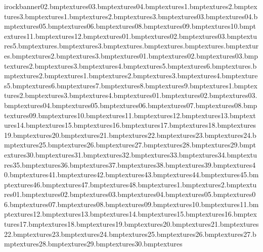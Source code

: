 irockbanner02.bmp textures\safarirockbanner03.bmp textures\safarirockbanner04.bmp textures\safaristepsand1.bmp textures\safaristepsand2.bmp textures\safaristepsand3.bmp textures\safaristepstriangles1.bmp textures\safaristepstriangles2.bmp textures\safaristepstriangles3.bmp textures\safaritemple03.bmp textures\safaritemple04.bmp textures\safaritemple05.bmp textures\safaritemple06.bmp textures\safaritemple08.bmp textures\safaritemple09.bmp textures\safaritemple10.bmp textures\safaritemple11.bmp textures\safaritemple12.bmp textures\safaritemplefloor01.bmp textures\safaritemplefloor02.bmp textures\safaritemplefloor03.bmp textures\safe5.bmp textures\safeback.bmp textures\safeside3.bmp textures\safsamface.bmp textures\safwheel.bmp textures\safwheelgrip.bmp textures\sand.bmp textures\sand2.bmp textures\sand3.bmp textures\sandbeach01.bmp textures\sandbeach02.bmp textures\sandbeach03.bmp textures\sandbed2.bmp textures\sandbed3.bmp textures\sandbed4.bmp textures\sandbed5.bmp textures\sandbed6.bmp textures\sandbedrock.bmp textures\sandbedrock2.bmp textures\sandcastle1.bmp textures\sandcastle2.bmp textures\sandcastle3.bmp textures\sandcastle4.bmp textures\sandcastle5.bmp textures\sandcastle6.bmp textures\sandcastle7.bmp textures\sandcastle8.bmp textures\sandcastle9.bmp textures\sandedge1.bmp textures\sandedge2.bmp textures\sandedge3.bmp textures\sandedge4.bmp textures\sandrock01.bmp textures\sandrock02.bmp textures\sandrock03.bmp textures\sandrock04.bmp textures\sandrock05.bmp textures\sandrock06.bmp textures\sandrock07.bmp textures\sandrock08.bmp textures\sandrock09.bmp textures\sandrock10.bmp textures\sandrock11.bmp textures\sandrock12.bmp textures\sandrock13.bmp textures\sandrock14.bmp textures\sandrock15.bmp textures\sandrock16.bmp textures\sandrock17.bmp textures\sandrock18.bmp textures\sandrock19.bmp textures\sandrock20.bmp textures\sandrock21.bmp textures\sandrock22.bmp textures\sandrock23.bmp textures\sandrock24.bmp textures\sandrock25.bmp textures\sandrock26.bmp textures\sandrock27.bmp textures\sandrock28.bmp textures\sandrock29.bmp textures\sandrock30.bmp textures\sandrock31.bmp textures\sandrock32.bmp textures\sandrock33.bmp textures\sandrock34.bmp textures\sandrock35.bmp textures\sandrock36.bmp textures\sandrock37.bmp textures\sandrock38.bmp textures\sandrock39.bmp textures\sandrock40.bmp textures\sandrock41.bmp textures\sandrock42.bmp textures\sandrock43.bmp textures\sandrock44.bmp textures\sandrock45.bmp textures\sandrock46.bmp textures\sandrock47.bmp textures\sandrock48.bmp textures\sandstep1.bmp textures\sandstep2.bmp textures\sharprock01.bmp textures\sharprock02.bmp textures\sharprock03.bmp textures\sharprock04.bmp textures\sharprock05.bmp textures\sharprock06.bmp textures\sharprock07.bmp textures\sharprock08.bmp textures\sharprock09.bmp textures\sharprock10.bmp textures\sharprock11.bmp textures\sharprock12.bmp textures\sharprock13.bmp textures\sharprock14.bmp textures\sharprock15.bmp textures\sharprock16.bmp textures\sharprock17.bmp textures\sharprock18.bmp textures\sharprock19.bmp textures\sharprock20.bmp textures\sharprock21.bmp textures\sharprock22.bmp textures\sharprock23.bmp textures\sharprock24.bmp textures\sharprock25.bmp textures\sharprock26.bmp textures\sharprock27.bmp textures\sharprock28.bmp textures\sharprock29.bmp textures\sharprock30.bmp textures\sharprock